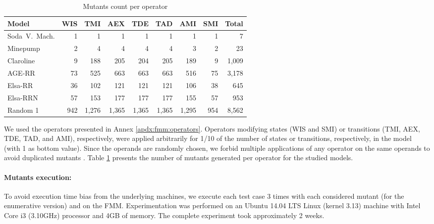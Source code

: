 \begin{table}[t]
\centering
\caption{Mutants count per operator}
\begin{small}
\begin{tabular}{l r r r r r r r r}
\hline
\textbf{Model}	& \textbf{WIS}	& \textbf{TMI}	& \textbf{AEX} & \textbf{TDE}	& \textbf{TAD} & \textbf{AMI} & \textbf{SMI} & \textbf{Total}\\
\hline 
Soda~V.~Mach.	& 1		& 1		& 1	& 1		& 1	& 1	& 1	& 7 \\
Minepump			& 2		& 4		& 4	& 4		& 4	& 3	& 2	& 23 	\\
Claroline		& 9		& 188	& 205	& 204		& 205	& 189	& 9	& 1,009	\\
AGE-RR			& 73		& 525	& 663 	& 663		& 663	& 516	& 75	& 3,178 \\
Elsa-RR			& 36		& 102	& 121	& 121	& 121	& 106	& 38		& 645 \\
Elsa-RRN			& 57		& 153	& 177	& 177	& 177	& 155	& 57		& 953 \\
Random 1 			& 942	& 1,276	& 1,365 	& 1,365	& 1,365 & 1,295 & 954 	& 8,562 \\
\hline
\end{tabular}
\end{small}
\label{tab:experiment:fmmexec:mutants}
\end{table}

We used the operators presented in Annex \ref{apdx:fmm:operators}. Operators modifying states (WIS and SMI) or transitions (TMI, AEX, TDE, TAD, and AMI), respectively, were applied arbitrarily for 1/10 of the number of states or transitions, respectively, in the model (with 1 as bottom value). Since the operands are randomly chosen, we forbid multiple applications of any operator on the same operands to avoid duplicated mutants \cite{Papadakis2015}. Table \ref{tab:experiment:fmmexec:mutants} presents the number of mutants generated per operator for the studied models.


\paragraph{Mutants execution:}

To avoid execution time bias from the underlying machines, we execute each test case 3 times with each considered mutant (for the enumerative version) and on the FMM. Experimentation was performed on an Ubuntu 14.04 LTS Linux (kernel 3.13) machine with Intel Core i3 (3.10GHz) processor and 4GB of memory. The complete experiment took approximately 2 weeks.

